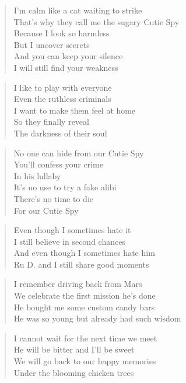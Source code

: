 
\begin{verse}
I'm calm like a cat waiting to strike\\
That's why they call me the sugary Cutie Spy\\
Because I look so harmless\\
But I uncover secrets\\
And you can keep your silence \\
I will still find your weakness
\end{verse}

\begin{verse}
I like to play with everyone\\
Even the ruthless criminals\\
I want to make them feel at home\\
So they finally reveal \\
The darkness of their soul
\end{verse}

\begin{verse}
No one can hide from our Cutie Spy\\
You'll confess your crime \\
In his lullaby\\
It's no use to try a fake alibi\\
There's no time to die\\
For our Cutie Spy
\end{verse}

\begin{verse}
Even though I sometimes hate it\\
I still believe in second chances\\
And even though I sometimes hate him\\
Ru D. and I still share good moments
\end{verse}

\begin{verse}
I remember driving back from Mars\\
We celebrate the first mission he's done\\
He bought me some custom candy bars\\
He was so young but already had such wisdom
\end{verse}

\begin{verse}
I cannot wait for the next time we meet\\
He will be bitter and I'll be sweet\\
We will go back to our happy memories\\
Under the blooming chicken trees
\end{verse}

